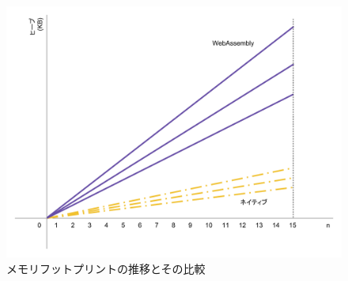 \begin{figure}[htbp]
  \caption{メモリフットプリントの推移とその比較}
  \label{fig:heap_size}
  \begin{center}
    \includegraphics[bb=0 0 800 600,width=12cm]{img/heap_size.pdf}
  \end{center}
\end{figure}
